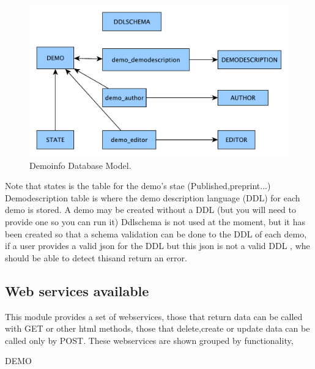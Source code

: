 \begin{figure}[!ht]
\centering
\includegraphics[width=0.5\columnwidth]{demo_info/images/demoinfo_model.pdf}
\caption{Demoinfo Database Model.} 
\label{fig:demoinfo_model}
\end{figure}

Note that states is the table for the demo's stae (Published,preprint...)
Demodescription table is where the demo description language (DDL) for each demo is stored.
A demo may be created without a DDL (but you will need to provide one so you can run it)
Ddlschema is not used at the moment, but it has been created so that a schema validation can be done to the DDL of each demo, if a user provides a valid json for the DDL but this json is not a valid DDL , whe should be able to detect thisand return an error.

\subsection{Web services available}
This module provides a set of webservices, those that return data can be called with GET or other html methods, those that delete,create or update data can be called only by POST.
These webservices are shown grouped by functionality, 


DEMO

